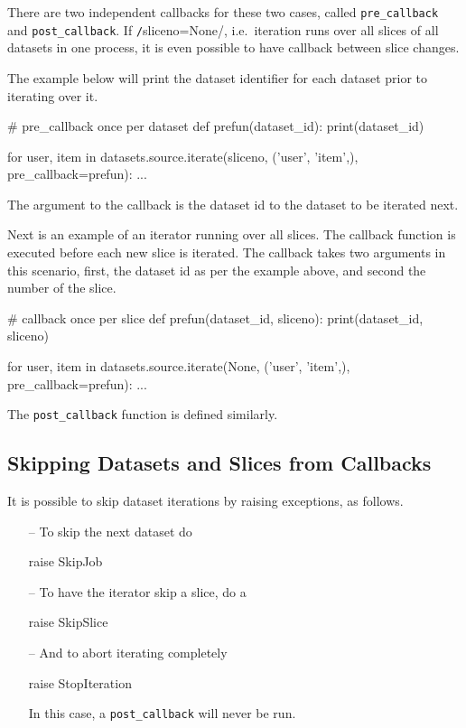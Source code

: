 There are two independent callbacks for these two cases,
called \texttt{pre\_callback} and \texttt{post\_callback}.
If \texttt/sliceno=None/, i.e.\ iteration runs over all
slices of all datasets in one process, it is even possible to have
callback between slice changes.

The example below will print the dataset identifier for each dataset
prior to iterating over it.
\begin{python}
# pre_callback once per dataset
def prefun(dataset_id):
    print(dataset_id)

for user, item in datasets.source.iterate(sliceno, ('user', 'item',),
                                          pre_callback=prefun):
    ...
\end{python}
The argument to the callback is the dataset id to the dataset to be
iterated next.

Next is an example of an iterator running over all slices.  The
callback function is executed before each new slice is iterated.  The
callback takes two arguments in this scenario, first, the dataset id
as per the example above, and second the number of the slice.
\begin{python}
# callback once per slice
def prefun(dataset_id, sliceno):
    print(dataset_id, sliceno)

for user, item in datasets.source.iterate(None, ('user', 'item',),
                                          pre_callback=prefun):
    ...
\end{python}
The \texttt{post\_callback} function is defined similarly.



\subsection*{Skipping Datasets and Slices from Callbacks}
It is possible to skip dataset iterations by raising exceptions, as
follows.
\begin{itemize}
\item [--] To skip the next dataset do
\begin{python}
raise SkipJob
\end{python}

\item [--]  To have the iterator skip a slice, do a
\begin{python}
raise SkipSlice
\end{python}

\item [--] And to abort iterating completely
\begin{python}
raise StopIteration
\end{python}
In this case, a \texttt{post\_callback} will never be run.
\end{itemize}







